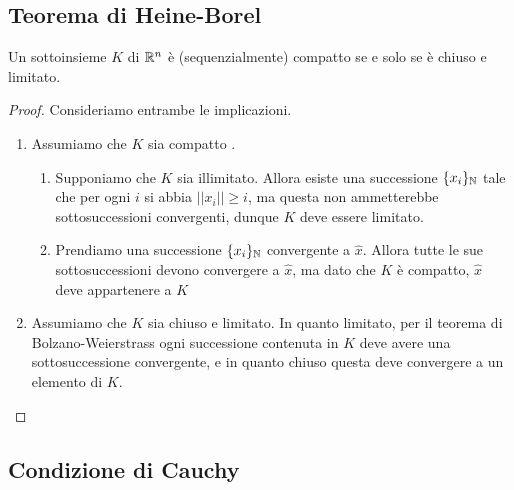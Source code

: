 \documentclass{article}
\begin{document}
\subsection{Teorema di Heine-Borel}
\begin{theorem}{}{}
    Un sottoinsieme $K$ di $\mathbb{R}^n$ è (sequenzialmente) compatto se e solo se è chiuso e limitato.
\end{theorem}
\begin{proof} Consideriamo entrambe le implicazioni.
    \begin{enumerate}
        \item Assumiamo che $K$ sia compatto .\begin{enumerate}
            \item Supponiamo che $K$ sia illimitato. Allora esiste una successione $\{x_i\}_{\mathbb{N}}$ tale che per ogni $i$ si abbia $||x_i||\ge i$, ma questa non ammetterebbe sottosuccessioni convergenti, dunque $K$ deve essere limitato.
            \item Prendiamo una successione $\{x_i\}_{\mathbb{N}}$ convergente a $\hat{x}$. Allora tutte le sue sottosuccessioni devono convergere a $\hat{x}$, ma dato che $K$ è compatto, $\hat{x}$ deve appartenere a $K$
        \end{enumerate}
        \item Assumiamo che $K$ sia chiuso e limitato. In quanto limitato, per il teorema di Bolzano-Weierstrass ogni successione contenuta in $K$ deve avere una sottosuccessione convergente, e in quanto chiuso questa deve convergere a un elemento di $K$.
    \end{enumerate}
\end{proof}

\subsection{Condizione di Cauchy}
\end{document}
